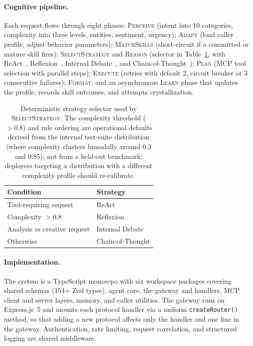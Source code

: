 \documentclass[11pt]{article}
\begin{document}
\paragraph{Cognitive pipeline.}
Each request flows through eight phases: \textsc{Perceive} (intent into 10 categories, complexity into three levels, entities, sentiment, urgency); \textsc{Adapt} (load caller profile, adjust behavior parameters); \textsc{MatchSkills} (short-circuit if a committed or mature skill fires); \textsc{SelectStrategy} and \textsc{Reason} (selector in Table~\ref{tab:strategy}, with ReAct~\citep{yao2023react}, Reflexion~\citep{shinn2023reflexion}, Internal Debate~\citep{du2023debate}, and Chain-of-Thought~\citep{wei2022chain}); \textsc{Plan} (MCP tool selection with parallel steps); \textsc{Execute} (retries with default 2, circuit breaker at 3 consecutive failures); \textsc{Format}; and an asynchronous \textsc{Learn} phase that updates the profile, records skill outcomes, and attempts crystallization.

\begin{table}[t]
  \small
  \centering
  \begin{tabular}{ll}
    \toprule
    Condition & Strategy \\
    \midrule
    Tool-requiring request          & ReAct \\
    Complexity $> 0.8$              & Reflexion \\
    Analysis or creative request    & Internal Debate \\
    Otherwise                       & Chain-of-Thought \\
    \bottomrule
  \end{tabular}
  \caption{Deterministic strategy selector used by \textsc{SelectStrategy}. The complexity threshold ($> 0.8$) and rule ordering are operational defaults derived from the internal test-suite distribution (where complexity clusters bimodally around $0.3$ and $0.85$), not from a held-out benchmark; deployers targeting a distribution with a different complexity profile should re-calibrate.}
  \label{tab:strategy}
\end{table}

\paragraph{Implementation.}
The system is a TypeScript monorepo with six workspace packages covering shared schemas (154+ Zod types), agent core, the gateway and handlers, MCP client and server layers, memory, and caller utilities. The gateway runs on Express.js~5 and mounts each protocol handler via a uniform \texttt{createRouter()} method, so that adding a new protocol affects only the handler and one line in the gateway. Authentication, rate limiting, request correlation, and structured logging are shared middleware.
\end{document}
